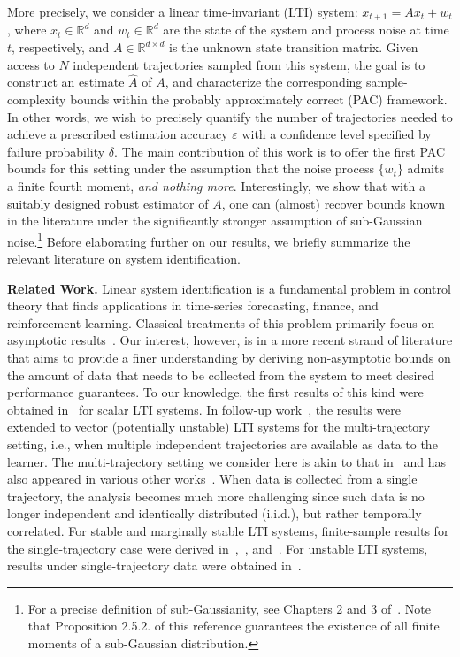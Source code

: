 \documentclass[letterpaper, 11 pt]{article}
\begin{document}
More precisely, we consider a linear time-invariant (LTI) system: 
$x_{t+1}= A x_t + w_t$, where $x_t \in \mathbb{R}^d$ and $w_t \in \mathbb{R}^d$ are the state of the system and process noise at time $t$, respectively, and $A \in \mathbb{R}^{d \times d}$ is the unknown state transition matrix. Given access to $N$ independent trajectories sampled from this system, the goal is to construct an estimate $\hat{A}$ of $A$, and characterize the corresponding sample-complexity bounds within the probably approximately correct (PAC) framework. In other words, we wish to precisely quantify the number of trajectories needed to achieve a prescribed estimation accuracy $\varepsilon$ with a confidence level specified by failure probability $\delta.$ The main contribution of this work is to offer the first PAC bounds for this setting under the assumption that the noise process $\{w_t\}$ admits a finite fourth moment, \emph{and nothing more}. Interestingly, we show that with a suitably designed robust estimator of $A$, one can (almost) recover bounds known in the literature under the significantly stronger assumption of sub-Gaussian noise.\footnote{For a precise definition of sub-Gaussianity, see Chapters 2 and 3 of~\cite{vershynin2018high}. Note that Proposition 2.5.2. of this reference guarantees the existence of all finite moments of a sub-Gaussian distribution.} Before elaborating further on our results, we briefly summarize the relevant literature on system identification. 

\noindent \textbf{Related Work.} Linear system identification is a fundamental problem in control theory that finds applications in time-series forecasting, finance, and reinforcement learning. Classical treatments of this problem primarily focus on asymptotic results~\cite{lai_asymp, ljung1987theory}. Our interest, however, is in a more recent strand of literature that aims to provide a finer understanding by deriving non-asymptotic bounds on the amount of data that needs to be collected from the system to meet desired performance guarantees. To our knowledge, the first results of this kind were obtained in~\cite{rantzer2018} for scalar LTI systems. In follow-up work~\cite{dean2020sample}, the results were extended to vector (potentially unstable) LTI systems for the multi-trajectory setting, i.e., when multiple independent trajectories are available as data to the learner. The multi-trajectory setting we consider here is akin to that in~\cite{dean2020sample} and has also appeared in various other works~\cite{zheng2020non, xing2020linear, xin2022learning, tu2024learning}. When data is collected from a single trajectory, the analysis becomes much more challenging since such data is no longer independent and identically distributed (i.i.d.), but rather temporally correlated. For stable and marginally stable LTI systems, finite-sample results for the single-trajectory case were derived in~\cite{simchowitz1},~\cite{oymak2019non}, and~\cite{jedra2022finite}. For unstable LTI systems, results under single-trajectory data were obtained in~\cite{sarkar2019near}. 
\end{document}
